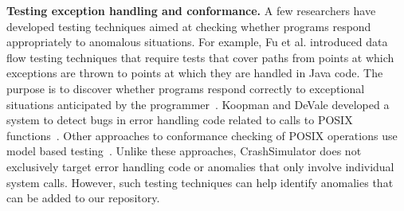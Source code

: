 \noindent
{\bf Testing exception handling and conformance.}
A few researchers have developed testing techniques aimed at checking
whether programs respond appropriately to anomalous situations.  For
example, Fu et al. introduced data flow testing techniques that require
tests that cover paths from points at which exceptions are thrown to
points at which they are handled in Java code. The purpose is to discover 
whether programs respond correctly to exceptional situations anticipated
by the programmer~\cite{DBLP:journals/tse/FuMRW05}.  Koopman
and DeVale developed a system to detect bugs in error handling code
related to calls to POSIX functions~\cite{Koopman00theexception}.
%
Other approaches to conformance checking of POSIX operations use model
based testing~\cite{Dadeau:2008:CSM:1433121.1433137,Farchi02}.
%
Unlike these approaches, CrashSimulator does not exclusively
target error handling code or anomalies that only involve individual
system calls. However, such testing techniques can help identify
anomalies that can be added to our repository.


%

